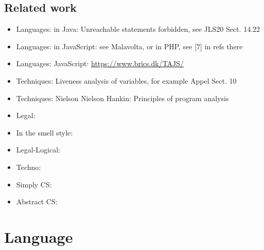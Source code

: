 \documentclass{IOS-Book-Article}
\begin{document}
\subsection{Related work}
\begin{itemize}
\item Languages: in Java: Unreachable statements forbidden, see JLS20 Sect. 14.22
\item Languages: in JavaScript: see Malavolta, or in PHP, see [7] in refs there
\item Languages: JavaScript: \url{https://www.brics.dk/TAJS/}
\item Techniques: Liveness analysis of variables, for example Appel Sect. 10
\item Techniques: Nielson Nielson Hankin: Principles of program analysis
\item Legal: \cite{coupette_hartung_etal_law_smells_2022}
\item In the smell style: \cite{romano_etal_2020}
\item Legal-Logical: \cite{fungwacharakorn_tsushima_satoh_legal_debugging_2021, fungwacharakorn_satoh_legal_rule_revision_debugging_2022}
\item Techno: \cite{scott_marcus_structured_legislation_2015}
\item Simply CS: \cite{neubauer_etal_accurate_dead_code_detection_2016}
\item Abstract CS: \cite{benton_relational_corr_proofs_static_analyses_2004}
\end{itemize}

\section{Language}\label{sec:language}







\end{document}
